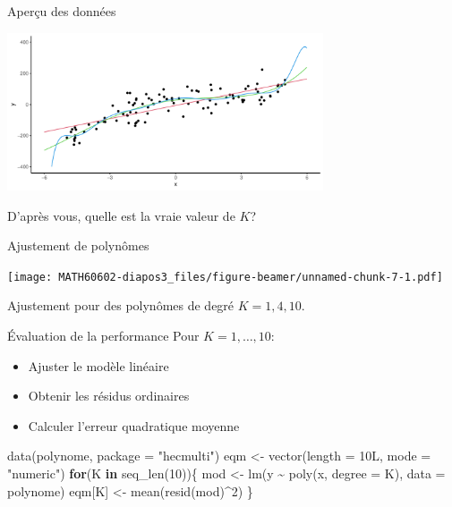 \documentclass[
  ignorenonframetext,
]{beamer}
\newenvironment{Shaded}{\begin{snugshade}}{\end{snugshade}}
\newcommand{\AttributeTok}[1]{\textcolor[rgb]{0.40,0.45,0.13}{#1}}
\newcommand{\ControlFlowTok}[1]{\textcolor[rgb]{0.00,0.23,0.31}{\textbf{#1}}}
\newcommand{\DecValTok}[1]{\textcolor[rgb]{0.68,0.00,0.00}{#1}}
\newcommand{\FunctionTok}[1]{\textcolor[rgb]{0.28,0.35,0.67}{#1}}
\newcommand{\NormalTok}[1]{\textcolor[rgb]{0.00,0.23,0.31}{#1}}
\newcommand{\OtherTok}[1]{\textcolor[rgb]{0.00,0.23,0.31}{#1}}
\newcommand{\SpecialCharTok}[1]{\textcolor[rgb]{0.37,0.37,0.37}{#1}}
\newcommand{\StringTok}[1]{\textcolor[rgb]{0.13,0.47,0.30}{#1}}
\providecommand{\tightlist}{%
  \setlength{\itemsep}{0pt}\setlength{\parskip}{0pt}}\usepackage{longtable,booktabs,array}
\begin{document}
\begin{frame}{Aperçu des données}
\label{aperuxe7u-des-donnuxe9es}
\begin{center}
\includegraphics[width=0.7\textwidth,height=\textheight]{MATH60602-diapos3_files/figure-beamer/unnamed-chunk-6-1.pdf}
\end{center}

D'après vous, quelle est la vraie valeur de \(K\)?
\end{frame}

\begin{frame}{Ajustement de polynômes}
\label{ajustement-de-polynuxf4mes}
\begin{center}
\texttt{[image: MATH60602-diapos3\_files/figure-beamer/unnamed-chunk-7-1.pdf]}
\end{center}

Ajustement pour des polynômes de degré \(K=1, 4, 10\).
\end{frame}

\begin{frame}[fragile]{Évaluation de la performance}
\label{uxe9valuation-de-la-performance}
Pour \(K=1, \ldots, 10\):

\begin{itemize}
\tightlist
\item
  Ajuster le modèle linéaire
\item
  Obtenir les résidus ordinaires
\item
  Calculer l'erreur quadratique moyenne
\end{itemize}

\begin{Shaded}
\begin{Highlighting}[numbers=left,,]
\FunctionTok{data}\NormalTok{(polynome, }\AttributeTok{package =} \StringTok{"hecmulti"}\NormalTok{)}
\NormalTok{eqm }\OtherTok{\textless{}{-}} \FunctionTok{vector}\NormalTok{(}\AttributeTok{length =} \DecValTok{10}\NormalTok{L, }\AttributeTok{mode =} \StringTok{"numeric"}\NormalTok{)}
\ControlFlowTok{for}\NormalTok{(K }\ControlFlowTok{in} \FunctionTok{seq\_len}\NormalTok{(}\DecValTok{10}\NormalTok{))\{}
\NormalTok{ mod }\OtherTok{\textless{}{-}} \FunctionTok{lm}\NormalTok{(y }\SpecialCharTok{\textasciitilde{}} \FunctionTok{poly}\NormalTok{(x, }\AttributeTok{degree =}\NormalTok{ K), }\AttributeTok{data =}\NormalTok{ polynome)}
\NormalTok{ eqm[K] }\OtherTok{\textless{}{-}} \FunctionTok{mean}\NormalTok{(}\FunctionTok{resid}\NormalTok{(mod)}\SpecialCharTok{\^{}}\DecValTok{2}\NormalTok{)}
\NormalTok{\}}
\end{Highlighting}
\end{Shaded}
\end{frame}
\end{document}
